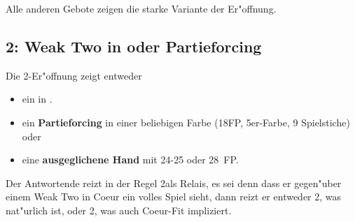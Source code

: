 Alle anderen Gebote zeigen die starke Variante der Er"offnung.

\subsection{2\kar: Weak Two in \co oder Partieforcing}

Die 2\kar-Er"offnung zeigt entweder
\begin{itemize}
\item ein  in \co.
\item ein \textbf{Partieforcing} in einer beliebigen Farbe
  (18\pl FP, 5\good{}\pl{}er-Farbe, 9 Spielstiche) oder
\item eine \textbf{ausgeglichene Hand} mit 24-25 oder 28\pl~FP.
\end{itemize}
Der Antwortende reizt in der Regel 2\coe als Relais, es sei denn dass
er gegen"uber einem Weak Two in Coeur ein volles Spiel sieht, dann reizt
er entweder 2\pik, was nat"urlich ist, oder 2\SA, was auch Coeur-Fit
impliziert.

